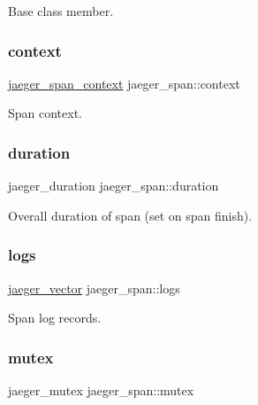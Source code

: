Base class member. 

\mbox{\label{structjaeger__span_a2c2ee45174f03b8453d60accd018a001}} 
\subsubsection{\texorpdfstring{context}{context}}
{\footnotesize\ttfamily \mbox{\hyperlink{structjaeger__span__context}{jaeger\+\_\+span\+\_\+context}} jaeger\+\_\+span\+::context}



Span context. 

\mbox{\label{structjaeger__span_a4486fea569d2256c8e33a8b445c3f4fc}} 
\subsubsection{\texorpdfstring{duration}{duration}}
{\footnotesize\ttfamily jaeger\+\_\+duration jaeger\+\_\+span\+::duration}



Overall duration of span (set on span finish). 

\mbox{\label{structjaeger__span_ab5b68679359d40f6821fffdbbb9cce01}} 
\subsubsection{\texorpdfstring{logs}{logs}}
{\footnotesize\ttfamily \mbox{\hyperlink{structjaeger__vector}{jaeger\+\_\+vector}} jaeger\+\_\+span\+::logs}



Span log records. 

\mbox{\label{structjaeger__span_a84d3f190ba0bb7106efdfe9d8e47beeb}} 
\subsubsection{\texorpdfstring{mutex}{mutex}}
{\footnotesize\ttfamily jaeger\+\_\+mutex jaeger\+\_\+span\+::mutex}



